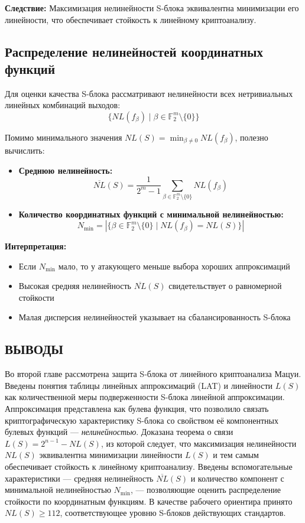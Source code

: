 \textbf{Следствие:} Максимизация нелинейности S-блока эквивалентна минимизации его линейности, что обеспечивает стойкость к линейному криптоанализу.


\subsection{Распределение нелинейностей координатных функций}

Для оценки качества S-блока рассматривают нелинейности всех нетривиальных линейных комбинаций выходов:
\[
    \{NL(f_\beta) \mid \beta \in \mathbb{F}_2^m \setminus \{0\}\}
\]

Помимо минимального значения $NL(S) = \min_{\beta \neq 0} NL(f_\beta)$, 
полезно вычислить:

\begin{itemize}
    \item \textbf{Среднюю нелинейность:}
    \[
        \overline{NL}(S) = \frac{1}{2^m - 1} \sum_{\beta \in \mathbb{F}_2^m \setminus \{0\}} NL(f_\beta)
    \]
    
    \item \textbf{Количество координатных функций с минимальной нелинейностью:}
    \[
        N_{\min} = |\{\beta \in \mathbb{F}_2^m \setminus \{0\} \mid NL(f_\beta) = NL(S)\}|
    \]
\end{itemize}

\textbf{Интерпретация:}
\begin{itemize}
    \item Если $N_{\min}$ мало, то у атакующего меньше выбора хороших аппроксимаций
    \item Высокая средняя нелинейность $\overline{NL}(S)$ свидетельствует о равномерной стойкости
    \item Малая дисперсия нелинейностей указывает на сбалансированность S-блока
\end{itemize}

\subsection*{ВЫВОДЫ}

Во второй главе рассмотрена защита S-блока от линейного криптоанализа
Мацуи. Введены понятия таблицы линейных аппроксимаций (LAT) и линейности
$L(S)$ как количественной меры подверженности S-блока линейной
аппроксимации. Аппроксимация представлена как булева функция, что
позволило связать криптографическую характеристику S-блока со
свойством её компонентных булевых функций — \emph{нелинейностью}.
Доказана теорема о связи $L(S) = 2^{n-1} - NL(S)$, из которой следует,
что максимизация нелинейности $NL(S)$ эквивалентна минимизации
линейности $L(S)$ и тем самым обеспечивает стойкость к линейному
криптоанализу. Введены вспомогательные характеристики — средняя
нелинейность $\overline{NL}(S)$ и количество компонент с минимальной
нелинейностью $N_{\min}$, — позволяющие оценить распределение
стойкости по координатным функциям. В качестве рабочего ориентира
принято $NL(S) \geq 112$, соответствующее уровню S-блоков
действующих стандартов.

